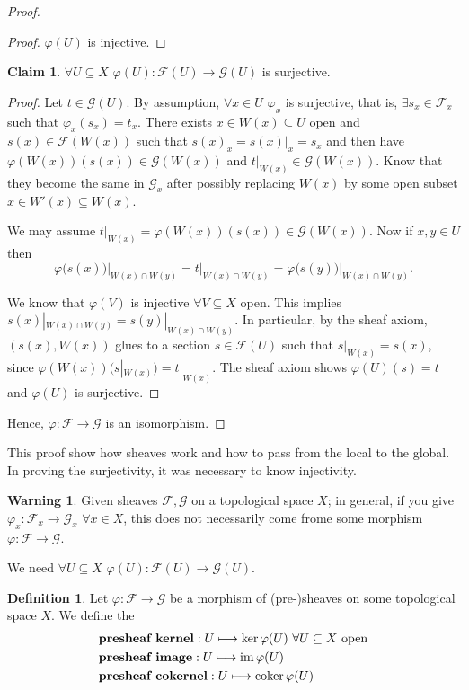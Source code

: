 \documentclass[12pt]{article}
\DeclareMathOperator{\im}{im}
\DeclareMathOperator{\coker}{coker}
\theoremstyle{definition}
\newtheorem*{definition}{Definition}
\newtheorem*{warning}{Warning}
\newtheorem*{claim}{Claim}
\begin{document}
\begin{proof}
\begin{itemize}
\begin{proof}
$\varphi(U)$ is injective.
\end{proof}

\begin{claim}
$\forall U\subseteq X$ $\varphi(U):\mathcal F(U)\rightarrow\mathcal G(U)$ is surjective.
\end{claim}

\begin{proof}
Let $t\in\mathcal G(U)$. By assumption, $\forall x\in U$ $\varphi_x$ is surjective, that is, $\exists s_x\in\mathcal F_x$ such that $\varphi_x(s_x)=t_x$. There exists $x\in W(x)\subseteq U$ open and $s(x)\in\mathcal F(W(x))$ such that $s(x)_x=s(x)|_x=s_x$ and then have $\varphi(W(x))(s(x))\in\mathcal G(W(x))$ and $t|_{W(x)}\in\mathcal G(W(x))$. Know that they become the same in $\mathcal G_x$ after possibly replacing $W(x)$ by some open subset $x\in W'(x)\subseteq W(x)$.

We may assume $t|_{W(x)}=\varphi(W(x))(s(x))\in\mathcal G(W(x))$. Now if $x,y\in U$ then
\[\varphi\big(s(x)\big)\big|_{W(x)\cap W(y)}=t|_{W(x)\cap W(y)}=\varphi\big(s(y)\big)\big|_{W(x)\cap W(y)}.\]

We know that $\varphi(V)$ is injective $\forall V\subseteq X$ open. This implies $s(x)|_{W(x)\cap W(y)}=s(y)|_{W(x)\cap W(y)}$. In particular, by the sheaf axiom, $(s(x),W(x))$ glues to a section $s\in\mathcal F(U)$ such that $s|_{W(x)}=s(x)$, since $\varphi(W(x))(s|_{W(x)})=t|_{W(x)}$. The sheaf axiom shows $\varphi(U)(s)=t$ and $\varphi(U)$ is surjective.
\end{proof}
\end{itemize}
Hence, $\varphi:\mathcal F\rightarrow\mathcal G$ is an isomorphism.
\end{proof}
This proof show how sheaves work and how to pass from the local to the global. In proving the surjectivity, it was necessary to know injectivity.

\begin{warning}
Given sheaves $\mathcal F,\mathcal G$ on a topological space $X$; in general, if you give $\varphi_x:\mathcal F_x\rightarrow\mathcal G_x$ $\forall x\in X$, this does not necessarily come frome some morphism $\varphi:\mathcal F\rightarrow\mathcal G$.

We need $\forall U\subseteq X$ $\varphi(U):\mathcal F(U)\rightarrow\mathcal G(U)$.
\end{warning}

\begin{definition}
Let $\varphi:\mathcal F\rightarrow\mathcal G$ be a morphism of (pre-)sheaves on some topological space $X$. We define the
\begin{align*}
&\text{\textbf{presheaf kernel}}:U\longmapsto\ker\varphi(U)\ \forall U\subseteq X\text{ open}\\&\text{\textbf{presheaf image}}:U\longmapsto\im\varphi(U)\\&\text{\textbf{presheaf cokernel}}:U\longmapsto\coker\varphi(U)
\end{align*}
\end{definition}
\end{document}
